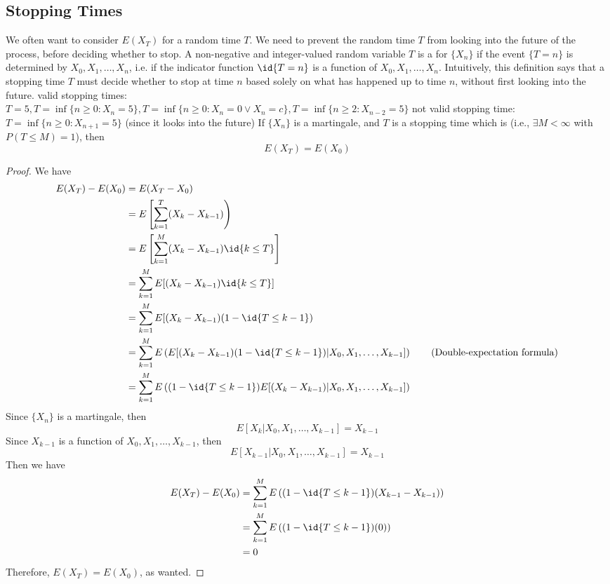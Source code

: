 \documentclass[11pt]{article}
\begin{document}
    \subsection{Stopping Times}
    We often want to consider $E(X_T)$ for a random time $T$. We need to prevent the random time $T$ from looking into the future of the process, before deciding whether to stop.
     A non-negative and integer-valued random variable $T$ is a  for $\{X_n\}$ if the event $\{T = n\}$ is determined by $X_0, X_1, \hdots, X_n$, i.e. if the indicator function $\id{T=n}$ is a function of $X_0, X_1, \hdots, X_n$.
    \remark
    Intuitively, this definition says that a stopping time $T$ must decide whether to stop at time $n$ based solely on what has happened up to time $n$, without first looking into the future.
    \example
    valid stopping times:\\
    $T=5, T=\inf\{n \geq 0: X_n = 5\}, T = \inf \{n \geq 0: X_n = 0 \lor X_n = c\}, T = \inf \{n \geq 2: X_{n-2} = 5\}$
    not valid stopping time:
    $T = \inf\{n \geq 0: X_{n+1} = 5\}$ (since it looks into the future)
     If $\{X_n\}$ is a martingale, and $T$ is a stopping time which is  (i.e., $\exists M < \infty$ with $P(T \leq M) = 1$), then 
    $$E(X_T) = E(X_0)$$
    \begin{proof}
    	We have
    	\begin{align*}
    		E(X_T) - E(X_0) &= E(X_T - X_0) \\
    		&= E\left[ \sum_{k=1}^T (X_k - X_{k-1}) \right)\\
    		&= E\left[ \sum_{k=1}^M (X_k - X_{k-1})\id{k\leq T}\right] \\
    		&= \sum_{k=1}^M E[(X_k - X_{k-1})\id{k\leq T}]\\
    		&= \sum_{k=1}^M E[(X_k - X_{k-1})(1-\id{T\leq k-1})\\
    		&= \sum_{k=1}^M E\left( E[(X_k - X_{k-1})(1-\id{T\leq k-1}) | X_0,X_1, \hdots, X_{k-1}] \right) \tag{Double-expectation formula}\\
    		&= \sum_{k=1}^M  E\left( (1-\id{T\leq k-1})E[(X_k - X_{k-1})| X_0,X_1, \hdots, X_{k-1}]\right)
    	\end{align*}
    	Since $\{X_n\}$ is a martingale, then
    	$$E[X_k|X_0, X_1, \hdots, X_{k-1}] = X_{k-1}$$
    	Since $X_{k-1}$ is a function of $X_0, X_1, \hdots, X_{k-1}$, then
    	$$E[X_{k-1}|X_0, X_1, \hdots, X_{k-1}] = X_{k-1}$$
    	Then we have
    	\begin{align*}
    		E(X_T) - E(X_0) &= \sum_{k=1}^M E\left( (1-\id{T\leq k-1})(X_{k-1} - X_{k-1})\right)\\
    		&= \sum_{k=1}^M E\left( (1-\id{T\leq k-1})(0)\right) \\
    		&= 0
    	\end{align*}
    	Therefore, $E(X_T) = E(X_0)$, as wanted.
    \end{proof}
\end{document}
